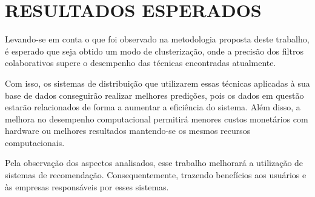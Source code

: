 \chapter{RESULTADOS ESPERADOS} \label{resultados}





Levando-se em conta o que foi observado na metodologia proposta deste trabalho, é esperado que seja obtido um modo de clusterização, onde a precisão dos filtros colaborativos supere o desempenho das técnicas encontradas atualmente.

Com isso, os sistemas de distribuição que utilizarem essas técnicas aplicadas à sua base de dados conseguirão realizar melhores predições, pois os dados em questão estarão relacionados de forma a aumentar a eficiência do sistema.
Além disso, a melhora no desempenho computacional permitirá menores custos monetários com hardware ou melhores resultados mantendo-se os mesmos recursos computacionais.

Pela observação dos aspectos analisados, esse trabalho melhorará a utilização de sistemas de recomendação. Consequentemente, trazendo benefícios aos usuários e às empresas responsáveis por esses sistemas.